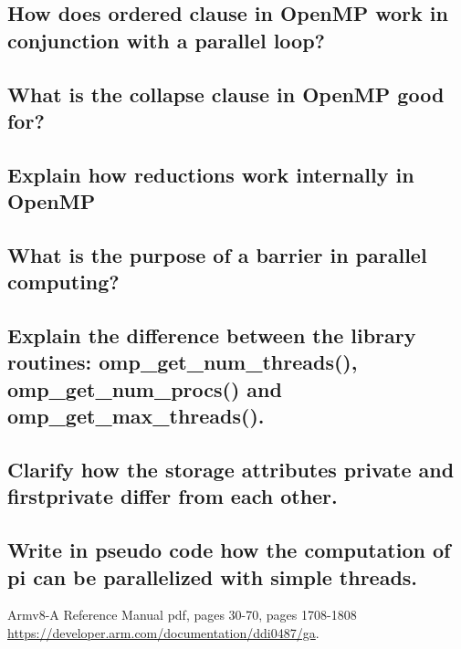 \documentclass[runningheads]{llncs}
\begin{document}
\subsection{How does ordered clause in OpenMP work in conjunction with a parallel loop?}
\subsection{What is the collapse clause in OpenMP good for?}
\subsection{Explain how reductions work internally in OpenMP}
\subsection{What is the purpose of a barrier in parallel computing?}
\subsection{Explain the difference between the library routines: omp\_get\_num\_threads(), omp\_get\_num\_procs() and omp\_get\_max\_threads().}
\subsection{Clarify how the storage attributes private and firstprivate differ from each other.}
\subsection{Write in pseudo code how the computation of pi can be parallelized with simple threads.}

%
%
%
% 
% 
%
\begin{thebibliography}{8}

Armv8-A Reference Manual pdf, pages 30-70, pages 1708-1808 \\ \url{https://developer.arm.com/documentation/ddi0487/ga}.

\end{thebibliography}
\end{document}

